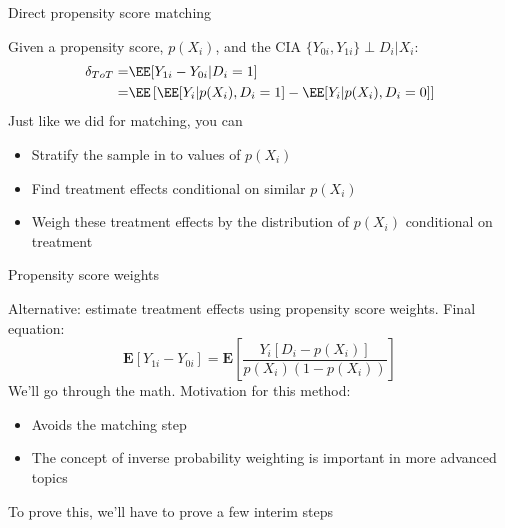 \documentclass[compress, 8pt]{beamer}
\begin{document}
\begin{frame}{Direct propensity score matching}

Given a propensity score, $p(X_i)$, and the CIA $\{Y_{0i}, Y_{1i}\} \perp D_i \vert X_i$:
\begin{align*}
    \delta_{ToT} =& \EE [Y_{1i} - Y_{0i} \vert D_i = 1] \\
    =& \EE \left[
        \EE [Y_i \vert p(X_i), D_i = 1]
        - \EE [Y_i\vert p(X_i), D_i = 0]
    \right]
\end{align*}
Just like we did for matching, you can
\begin{itemize}
    \item Stratify the sample in to values of $p(X_i)$
    \item Find treatment effects conditional on similar $p(X_i)$
    \item Weigh these treatment effects by the distribution of $p(X_i)$ conditional on treatment
\end{itemize}

\end{frame}

\begin{frame}{Propensity score weights}

Alternative: estimate treatment effects using propensity score weights. Final equation:
\begin{equation*}
    \mathbf{E} [Y_{1i} - Y_{0i}]
    = \mathbf{E} \left[ \frac{Y_i \left[ D_i - p(X_i) \right]}{p(X_i) (1 - p(X_i))} \right] 
\end{equation*}
We'll go through the math. Motivation for this method:
\begin{itemize}
    \item Avoids the matching step
    \item The concept of inverse probability weighting is important in more advanced topics
\end{itemize}
To prove this, we'll have to prove a few interim steps

\end{frame}
\end{document}
